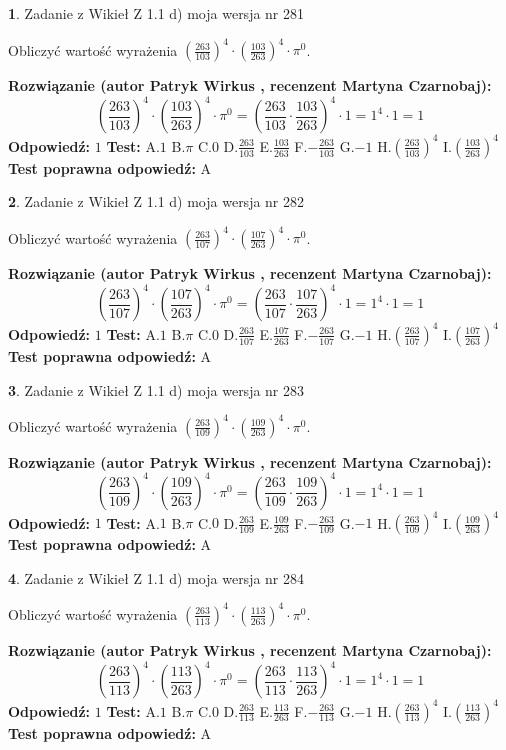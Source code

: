\documentclass[12pt, a4paper]{article}
\theoremstyle{definition} %
\newtheorem{zad}{}
\newcommand{\zadStart}[1]{\begin{zad}#1\newline}
\newcommand{\zadStop}{\end{zad}}
\newcommand{\rozwStart}[2]{\noindent \textbf{Rozwiązanie (autor #1 , recenzent #2): }\newline}
\newcommand{\rozwStop}{\newline}
\newcommand{\odpStart}{\noindent \textbf{Odpowiedź:}\newline}
\newcommand{\odpStop}{\newline}
\newcommand{\testStart}{\noindent \textbf{Test:}\newline}
\newcommand{\testStop}{\newline}
\newcommand{\kluczStart}{\noindent \textbf{Test poprawna odpowiedź:}\newline}
\newcommand{\kluczStop}{\newline}
\begin{document}
\zadStart{Zadanie z Wikieł Z 1.1 d) moja wersja nr 281}

Obliczyć wartość wyrażenia $(\frac{263}{103})^{4} \cdot (\frac{103}{263})^{4} \cdot \pi^{0}$.
\zadStop
\rozwStart{Patryk Wirkus}{Martyna Czarnobaj}
$$(\frac{263}{103})^{4} \cdot (\frac{103}{263})^{4} \cdot \pi^{0} = (\frac{263}{103} \cdot \frac{103}{263})^{4} \cdot 1 = 1^{4} \cdot 1 = 1$$
\rozwStop
\odpStart
$1$
\odpStop
\testStart
A.$1$ B.$\pi$ C.$0$ D.$\frac{263}{103}$ E.$\frac{103}{263}$
F.$-\frac{263}{103}$ G.$-1$
H.$(\frac{263}{103})^{4}$
I.$(\frac{103}{263})^{4}$
\testStop
\kluczStart
A
\kluczStop



\zadStart{Zadanie z Wikieł Z 1.1 d) moja wersja nr 282}

Obliczyć wartość wyrażenia $(\frac{263}{107})^{4} \cdot (\frac{107}{263})^{4} \cdot \pi^{0}$.
\zadStop
\rozwStart{Patryk Wirkus}{Martyna Czarnobaj}
$$(\frac{263}{107})^{4} \cdot (\frac{107}{263})^{4} \cdot \pi^{0} = (\frac{263}{107} \cdot \frac{107}{263})^{4} \cdot 1 = 1^{4} \cdot 1 = 1$$
\rozwStop
\odpStart
$1$
\odpStop
\testStart
A.$1$ B.$\pi$ C.$0$ D.$\frac{263}{107}$ E.$\frac{107}{263}$
F.$-\frac{263}{107}$ G.$-1$
H.$(\frac{263}{107})^{4}$
I.$(\frac{107}{263})^{4}$
\testStop
\kluczStart
A
\kluczStop



\zadStart{Zadanie z Wikieł Z 1.1 d) moja wersja nr 283}

Obliczyć wartość wyrażenia $(\frac{263}{109})^{4} \cdot (\frac{109}{263})^{4} \cdot \pi^{0}$.
\zadStop
\rozwStart{Patryk Wirkus}{Martyna Czarnobaj}
$$(\frac{263}{109})^{4} \cdot (\frac{109}{263})^{4} \cdot \pi^{0} = (\frac{263}{109} \cdot \frac{109}{263})^{4} \cdot 1 = 1^{4} \cdot 1 = 1$$
\rozwStop
\odpStart
$1$
\odpStop
\testStart
A.$1$ B.$\pi$ C.$0$ D.$\frac{263}{109}$ E.$\frac{109}{263}$
F.$-\frac{263}{109}$ G.$-1$
H.$(\frac{263}{109})^{4}$
I.$(\frac{109}{263})^{4}$
\testStop
\kluczStart
A
\kluczStop



\zadStart{Zadanie z Wikieł Z 1.1 d) moja wersja nr 284}

Obliczyć wartość wyrażenia $(\frac{263}{113})^{4} \cdot (\frac{113}{263})^{4} \cdot \pi^{0}$.
\zadStop
\rozwStart{Patryk Wirkus}{Martyna Czarnobaj}
$$(\frac{263}{113})^{4} \cdot (\frac{113}{263})^{4} \cdot \pi^{0} = (\frac{263}{113} \cdot \frac{113}{263})^{4} \cdot 1 = 1^{4} \cdot 1 = 1$$
\rozwStop
\odpStart
$1$
\odpStop
\testStart
A.$1$ B.$\pi$ C.$0$ D.$\frac{263}{113}$ E.$\frac{113}{263}$
F.$-\frac{263}{113}$ G.$-1$
H.$(\frac{263}{113})^{4}$
I.$(\frac{113}{263})^{4}$
\testStop
\kluczStart
A
\kluczStop
\end{document}
